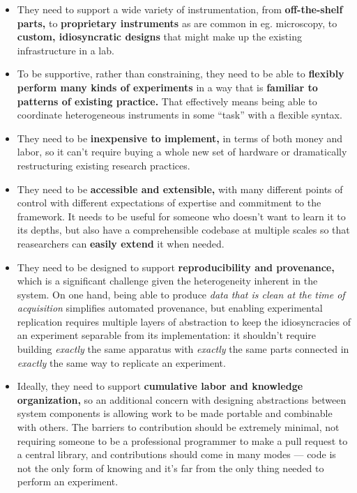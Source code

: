 \documentclass[10pt]{tufte-book}
\begin{document}
\begin{itemize}

\item
  They need to support a wide variety of instrumentation, from
  \textbf{off-the-shelf parts,} to \textbf{proprietary instruments} as
  are common in eg. microscopy, to \textbf{custom, idiosyncratic
  designs} that might make up the existing infrastructure in a lab.
\item
  To be supportive, rather than constraining, they need to be able to
  \textbf{flexibly perform many kinds of experiments} in a way that is
  \textbf{familiar to patterns of existing practice.} That effectively
  means being able to coordinate heterogeneous instruments in some
  ``task'' with a flexible syntax.
\item
  They need to be \textbf{inexpensive to implement,} in terms of both
  money and labor, so it can't require buying a whole new set of
  hardware or dramatically restructuring existing research practices.
\item
  They need to be \textbf{accessible and extensible,} with many
  different points of control with different expectations of expertise
  and commitment to the framework. It needs to be useful for someone who
  doesn't want to learn it to its depths, but also have a comprehensible
  codebase at multiple scales so that reasearchers can \textbf{easily
  extend} it when needed.
\item
  They need to be designed to support \textbf{reproducibility and
  provenance,} which is a significant challenge given the heterogeneity
  inherent in the system. On one hand, being able to produce \emph{data
  that is clean at the time of acquisition} simplifies automated
  provenance, but enabling experimental replication requires multiple
  layers of abstraction to keep the idiosyncracies of an experiment
  separable from its implementation: it shouldn't require building
  \emph{exactly} the same apparatus with \emph{exactly} the same parts
  connected in \emph{exactly} the same way to replicate an experiment.
\item
  Ideally, they need to support \textbf{cumulative labor and knowledge
  organization,} so an additional concern with designing abstractions
  between system components is allowing work to be made portable and
  combinable with others. The barriers to contribution should be
  extremely minimal, not requiring someone to be a professional
  programmer to make a pull request to a central library, and
  contributions should come in many modes --- code is not the only form
  of knowing and it's far from the only thing needed to perform an
  experiment.
\end{itemize}
\end{document}
